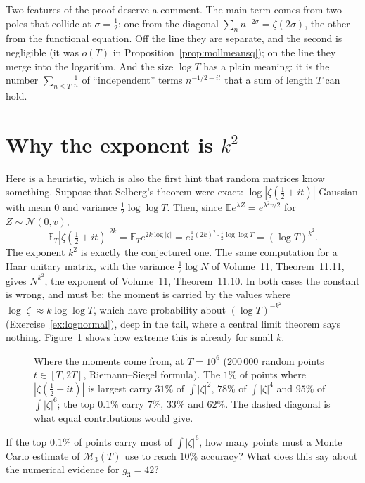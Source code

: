 Two features of the proof deserve a comment. The main term comes from two poles that collide at $\sigma=\frac12$: one from the diagonal $\sum_nn^{-2\sigma}=\zeta(2\sigma)$, the other from the functional equation. Off the line they are separate, and the second is negligible (it was $o(T)$ in Proposition~\ref{prop:mollmeansq}); on the line they merge into the logarithm. And the size $\log T$ has a plain meaning: it is the number $\sum_{n\le T}\frac1n$ of ``independent'' terms $n^{-1/2-it}$ that a sum of length $T$ can hold.

\section{Why the exponent is \texorpdfstring{$k^2$}{k squared}}

Here is a heuristic, which is also the first hint that random matrices know something. Suppose that Selberg's theorem were exact: $\log|\zeta(\frac12+it)|$ Gaussian with mean $0$ and variance $\frac12\log\log T$. Then, since $\mathbb Ee^{\lambda Z}=e^{\lambda^2v/2}$ for $Z\sim\mathcal N(0,v)$,
\[
\mathbb E_T|\zeta(\tfrac12+it)|^{2k}=\mathbb E_Te^{2k\log|\zeta|}=e^{\frac12(2k)^2\cdot\frac12\log\log T}=(\log T)^{k^2}.
\]
The exponent $k^2$ is exactly the conjectured one. The same computation for a Haar unitary matrix, with the variance $\frac12\log N$ of Volume~11, Theorem~11.11, gives $N^{k^2}$, the exponent of Volume~11, Theorem~11.10. In both cases the constant is wrong, and must be: the moment is carried by the values where $\log|\zeta|\approx k\log\log T$, which have probability about $(\log T)^{-k^2}$ (Exercise~\ref{ex:lognormal}), deep in the tail, where a central limit theorem says nothing. Figure~\ref{fig:momentshare} shows how extreme this is already for small $k$.

\begin{figure}[ht]
\centering{}
\caption{Where the moments come from, at $T=10^6$ ($200\,000$ random points $t\in[T,2T]$, Riemann--Siegel formula). The $1\%$ of points where $|\zeta(\frac12+it)|$ is largest carry $31\%$ of $\int|\zeta|^2$, $78\%$ of $\int|\zeta|^4$ and $95\%$ of $\int|\zeta|^6$; the top $0.1\%$ carry $7\%$, $33\%$ and $62\%$. The dashed diagonal is what equal contributions would give.}
\label{fig:momentshare}
\end{figure}

\begin{think}
If the top $0.1\%$ of points carry most of $\int|\zeta|^6$, how many points must a Monte Carlo estimate of $\mathcal M_3(T)$ use to reach $10\%$ accuracy? What does this say about the numerical evidence for $g_3=42$?
\end{think}

